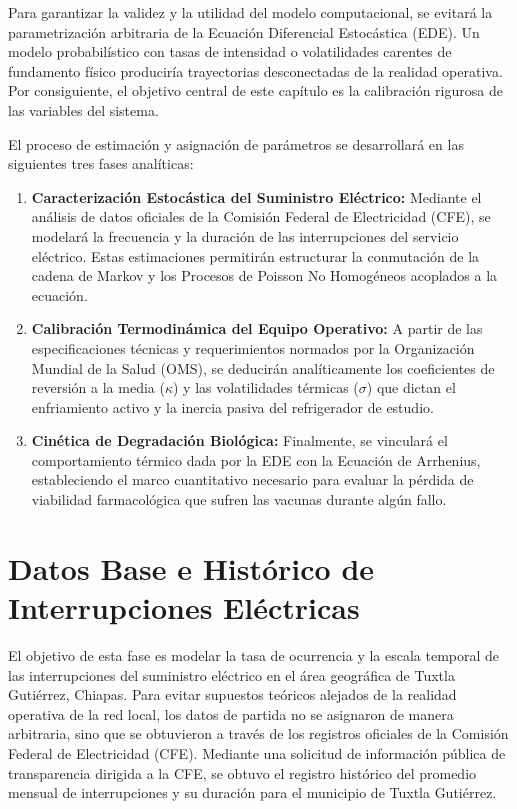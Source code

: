 \documentclass[
  spanish,
  letterpaper,
  DIV=11,
  numbers=noendperiod]{scrreprt}
\providecommand{\tightlist}{%
  \setlength{\itemsep}{0pt}\setlength{\parskip}{0pt}}
\theoremstyle{plain}
\theoremstyle{plain}
\theoremstyle{plain}
\theoremstyle{definition}
\theoremstyle{remark}
\begin{document}
Para garantizar la validez y la utilidad del modelo computacional, se
evitará la parametrización arbitraria de la Ecuación Diferencial
Estocástica (EDE). Un modelo probabilístico con tasas de intensidad o
volatilidades carentes de fundamento físico produciría trayectorias
desconectadas de la realidad operativa. Por consiguiente, el objetivo
central de este capítulo es la calibración rigurosa de las variables del
sistema.

El proceso de estimación y asignación de parámetros se desarrollará en
las siguientes tres fases analíticas:

\begin{enumerate}
\def\labelenumi{\arabic{enumi}.}
\tightlist
\item
  \textbf{Caracterización Estocástica del Suministro Eléctrico:}
  Mediante el análisis de datos oficiales de la Comisión Federal de
  Electricidad (CFE), se modelará la frecuencia y la duración de las
  interrupciones del servicio eléctrico. Estas estimaciones permitirán
  estructurar la conmutación de la cadena de Markov y los Procesos de
  Poisson No Homogéneos acoplados a la ecuación.
\item
  \textbf{Calibración Termodinámica del Equipo Operativo:} A partir de
  las especificaciones técnicas y requerimientos normados por la
  Organización Mundial de la Salud (OMS), se deducirán analíticamente
  los coeficientes de reversión a la media (\(\kappa\)) y las
  volatilidades térmicas (\(\sigma\)) que dictan el enfriamiento activo
  y la inercia pasiva del refrigerador de estudio.
\item
  \textbf{Cinética de Degradación Biológica:} Finalmente, se vinculará
  el comportamiento térmico dada por la EDE con la Ecuación de
  Arrhenius, estableciendo el marco cuantitativo necesario para evaluar
  la pérdida de viabilidad farmacológica que sufren las vacunas durante
  algún fallo.
\end{enumerate}

\section{Datos Base e Histórico de Interrupciones
Eléctricas}\label{sec-datos-cfe}

El objetivo de esta fase es modelar la tasa de ocurrencia y la escala
temporal de las interrupciones del suministro eléctrico en el área
geográfica de Tuxtla Gutiérrez, Chiapas. Para evitar supuestos teóricos
alejados de la realidad operativa de la red local, los datos de partida
no se asignaron de manera arbitraria, sino que se obtuvieron a través de
los registros oficiales de la Comisión Federal de Electricidad (CFE).
Mediante una solicitud de información pública de transparencia dirigida
a la CFE, se obtuvo el registro histórico del promedio mensual de
interrupciones y su duración para el municipio de Tuxtla Gutiérrez.
\end{document}
